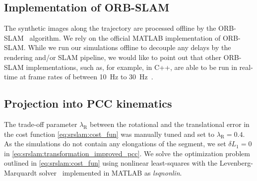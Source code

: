 \subsection{Implementation of ORB-SLAM}
The synthetic images along the trajectory are processed offline by the ORB-SLAM~\cite{mur2017orb} algorithm. We rely on the official MATLAB implementation of ORB-SLAM. While we run our simulations offline to decouple any delays by the rendering and/or \gls{SLAM} pipeline, we would like to point out that other ORB-SLAM implementations, such as, for example, in C++, are able to be run in real-time at frame rates of between \SI{10}{Hz} to \SI{30}{Hz}~\cite{mur2017orb}.

\subsection{Projection into PCC kinematics}
The trade-off parameter $\lambda_\mathrm{R}$ between the rotational and the translational error in the cost function \eqref{eq:srslam:cost_fun} was manually tuned and set to $\lambda_\mathrm{R}=0.4$.
As the simulations do not contain any elongations of the segment, we set $\delta L_1 = 0$ in \eqref{eq:srslam:transformation_improved_pcc}. 
We solve the optimization problem outlined in \eqref{eq:srslam:cost_fun} using nonlinear least-squares with the Levenberg-Marquardt solver~\cite{levenberg1944method, marquardt1963algorithm} implemented in MATLAB as \emph{lsqnonlin}.

